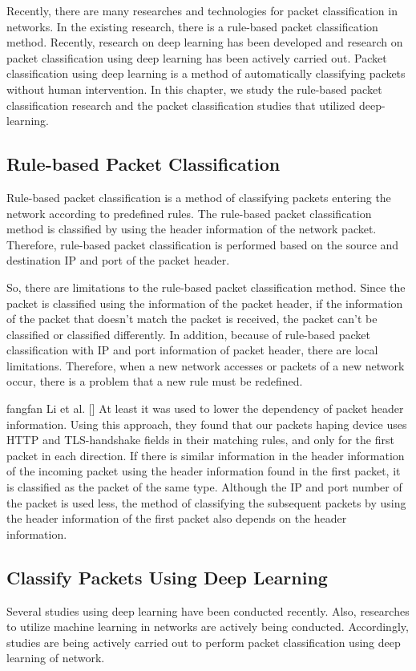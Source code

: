 Recently, there are many researches and technologies for packet classification in networks.
In the existing research, there is a rule-based packet classification method.
Recently, research on deep learning has been developed and research on packet classification using deep learning has been actively carried out.
Packet classification using deep learning is a method of automatically classifying packets without human intervention.
In this chapter, we study the rule-based packet classification research and the packet classification studies that utilized deep-learning.

\subsection{Rule-based Packet Classification}\label{subsec:rule-basedPacketClassification}
Rule-based packet classification is a method of classifying packets entering the network according to predefined rules.
The rule-based packet classification method is classified by using the header information of the network packet.
Therefore, rule-based packet classification is performed based on the source and destination IP and port of the packet header.

So, there are limitations to the rule-based packet classification method.
Since the packet is classified using the information of the packet header, if the information of the packet that doesn't match the packet is received, the packet can't be classified or classified differently.
In addition, because of rule-based packet classification with IP and port information of packet header, there are local limitations.
Therefore, when a new network accesses or packets of a new network occur, there is a problem that a new rule must be redefined.

fangfan Li et al. [] At least it was used to lower the dependency of packet header information.
Using this approach, they found that our packets haping device uses HTTP and TLS-handshake fields in their matching rules, and only for the first packet in each direction.
If there is similar information in the header information of the incoming packet using the header information found in the first packet, it is classified as the packet of the same type.
Although the IP and port number of the packet is used less, the method of classifying the subsequent packets by using the header information of the first packet also depends on the header information.

\subsection{Classify Packets Using Deep Learning}\label{subsec:classifyPacketsUsingDeepLearning}
Several studies using deep learning have been conducted recently.
Also, researches to utilize machine learning in networks are actively being conducted.
Accordingly, studies are being actively carried out to perform packet classification using deep learning of network.

